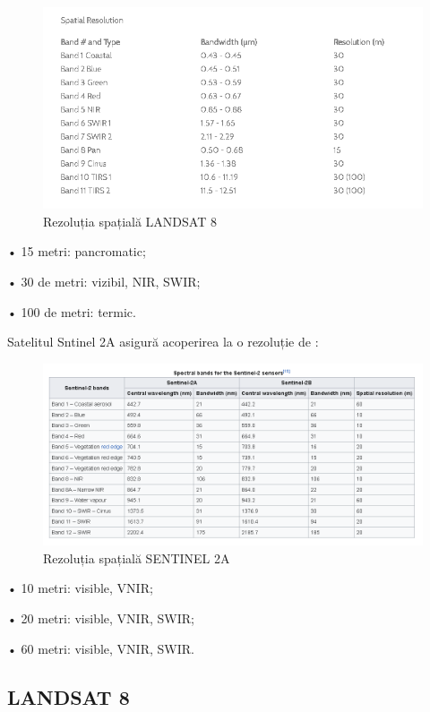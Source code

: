 \documentclass[12pt,a4paper]{article}
\theoremstyle{definition}
\theoremstyle{remark}
\begin{document}
\begin{figure}[H]
  \centering
  \includegraphics[width=400pt]{landsatspatial2.PNG}
  \caption{Rezoluția spațială LANDSAT 8 \cite{spatiala}}   
\end{figure}

• 15 metri: pancromatic;

• 30 de metri: vizibil, NIR, SWIR;

• 100 de metri: termic.

Satelitul Sntinel 2A asigură acoperirea la o rezoluție de \cite{spatialasentinel}
\cite{spatialasentinel2}: 


\begin{figure}[H]
  \centering
  \includegraphics[width=400pt]{sentinelspatial.PNG}
  \caption{Rezoluția spațială SENTINEL 2A \cite{spatialasentinel}}   
\end{figure}

• 10 metri: visible, VNIR;

• 20 metri: visible, VNIR, SWIR;


• 60 metri: visible, VNIR, SWIR. 


\subsection{LANDSAT 8}
\end{document}
